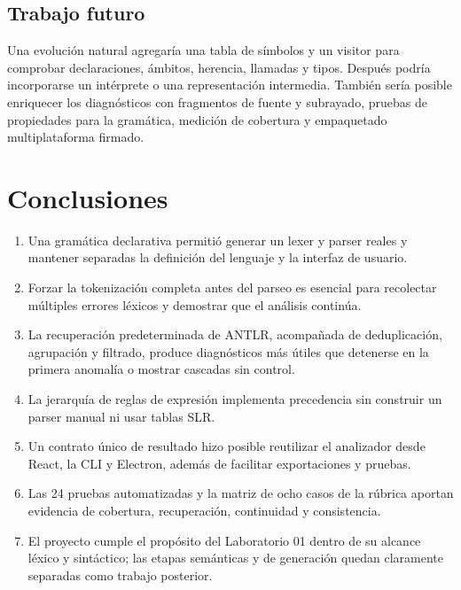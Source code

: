 \documentclass[12pt,letterpaper,oneside]{report}
\begin{document}
\section{Trabajo futuro}

Una evolución natural agregaría una tabla de símbolos y un visitor para comprobar
declaraciones, ámbitos, herencia, llamadas y tipos. Después podría incorporarse un
intérprete o una representación intermedia. También sería posible enriquecer los
diagnósticos con fragmentos de fuente y subrayado, pruebas de propiedades para la
gramática, medición de cobertura y empaquetado multiplataforma firmado.

\chapter{Conclusiones}

\begin{enumerate}
  \item Una gramática declarativa permitió generar un lexer y parser reales y
        mantener separadas la definición del lenguaje y la interfaz de usuario.
  \item Forzar la tokenización completa antes del parseo es esencial para recolectar
        múltiples errores léxicos y demostrar que el análisis continúa.
  \item La recuperación predeterminada de ANTLR, acompañada de deduplicación,
        agrupación y filtrado, produce diagnósticos más útiles que detenerse en la
        primera anomalía o mostrar cascadas sin control.
  \item La jerarquía de reglas de expresión implementa precedencia sin construir un
        parser manual ni usar tablas SLR.
  \item Un contrato único de resultado hizo posible reutilizar el analizador desde
        React, la CLI y Electron, además de facilitar exportaciones y pruebas.
  \item Las 24 pruebas automatizadas y la matriz de ocho casos de la rúbrica aportan
        evidencia de cobertura, recuperación, continuidad y consistencia.
  \item El proyecto cumple el propósito del Laboratorio 01 dentro de su alcance
        léxico y sintáctico; las etapas semánticas y de generación quedan claramente
        separadas como trabajo posterior.
\end{enumerate}
\end{document}
